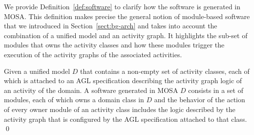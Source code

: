 {We provide Definition~\ref{def:software} to clarify how the software is generated in MOSA. This definition makes precise the general notion of module-based software that we introduced in Section~\ref{sect:bg-arch} and takes into account the combination of a unified model and an activity graph. It highlights the sub-set of modules that owns the activity classes and how these modules trigger the execution of the activity graphs of the associated activities.

\begin{definition} \label{def:software}
	Given a unified model $D$ that contains a non-empty set of activity classes, each of which is attached to an AGL specification describing the activity graph logic of an activity of the domain. A software generated in MOSA \wrt $D$ consists in a set of modules, each of which owns a domain class in $D$ and the behavior of the  action of every owner module of an activity class includes the logic described by the activity graph that is configured by the AGL specification attached to that class. \qed
\end{definition}

}
